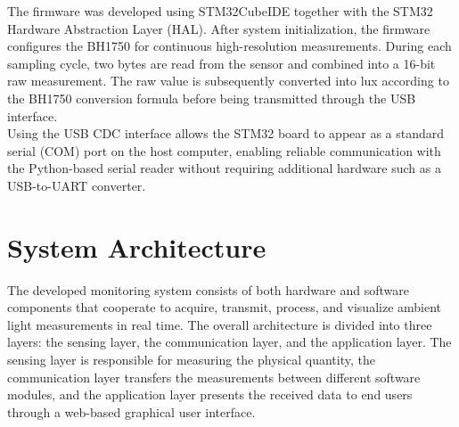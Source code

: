\documentclass[11pt]{article}
\begin{document}
The firmware was developed using STM32CubeIDE together with the STM32 Hardware Abstraction Layer (HAL). After system initialization, the firmware configures the BH1750 for continuous high-resolution measurements. During each sampling cycle, two bytes are read from the sensor and combined into a 16-bit raw measurement. The raw value is subsequently converted into lux according to the BH1750 conversion formula before being transmitted through the USB interface.\\[0.1em]

Using the USB CDC interface allows the STM32 board to appear as a standard serial (COM) port on the host computer, enabling reliable communication with the Python-based serial reader without requiring additional hardware such as a USB-to-UART converter.

\section{System Architecture}

The developed monitoring system consists of both hardware and software components that cooperate to acquire, transmit, process, and visualize ambient light measurements in real time. The overall architecture is divided into three layers: the sensing layer, the communication layer, and the application layer. The sensing layer is responsible for measuring the physical quantity, the communication layer transfers the measurements between different software modules, and the application layer presents the received data to end users through a web-based graphical user interface.
\end{document}
